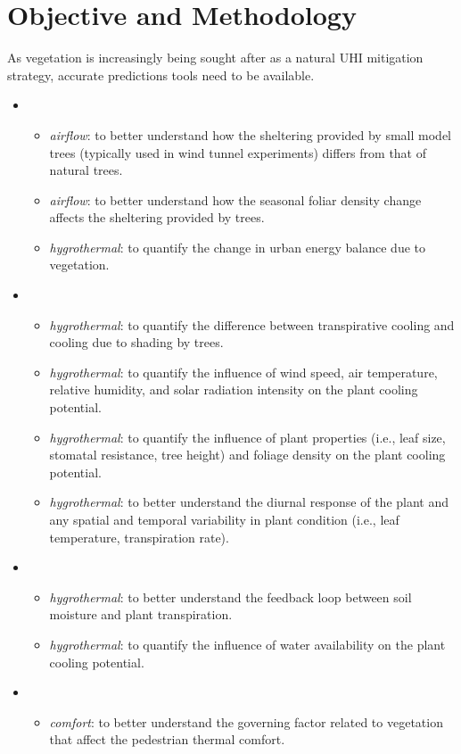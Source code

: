 \section{Objective and Methodology}

As vegetation is increasingly being sought after as a natural UHI mitigation strategy, accurate predictions tools need to be available. 

\begin{itemize}
	\item {}
	\begin{itemize}
		\item \textit{airflow}: to better understand how the sheltering provided by small model trees (typically used in wind tunnel experiments) differs from that of natural trees.
		\item \textit{airflow}: to better understand how the seasonal foliar density change affects the sheltering provided by trees.
		\item \textit{hygrothermal}: to quantify the change in urban energy balance due to vegetation.
	\end{itemize}
	\item {}
		\begin{itemize}
		\item \textit{hygrothermal}: to quantify the difference between transpirative cooling and cooling due to shading by trees.
			\item \textit{hygrothermal}: to quantify the influence of wind speed, air temperature, relative humidity, and solar radiation intensity on the plant cooling potential.					
			\item \textit{hygrothermal}: to quantify the influence of plant properties (i.e., leaf size, stomatal resistance, tree height) and foliage density on the plant cooling potential.			
			\item \textit{hygrothermal}: to better understand the diurnal response of the plant and any spatial and temporal variability in plant condition (i.e., leaf temperature, transpiration rate).	
		\end{itemize}		
	\item {}
		\begin{itemize}
			\item \textit{hygrothermal}: to better understand the feedback loop between soil moisture and plant transpiration.			
			\item \textit{hygrothermal}: to quantify the influence of water availability on the plant cooling potential.
		\end{itemize}
	\item {}
		\begin{itemize}
			\item \textit{comfort}: to better understand the governing factor related to vegetation that affect the pedestrian thermal comfort. 				
		\end{itemize}
\end{itemize}
